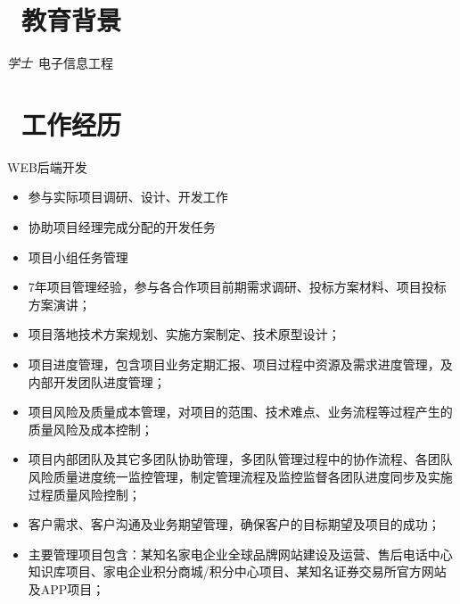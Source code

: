 \documentclass{resume}
\begin{document}


 
\section{\faGraduationCap\  教育背景}
\textit{学士}\ 电子信息工程 

\section{\faUsers\ 工作经历}
\role{软件开发工程师}{}
WEB后端开发
\begin{itemize}
\item 参与实际项目调研、设计、开发工作
\item 协助项目经理完成分配的开发任务
\item 项目小组任务管理
\end{itemize}

\begin{itemize}
    \item 7年项目管理经验，参与各合作项目前期需求调研、投标方案材料、项目投标方案演讲；
    \item 项目落地技术方案规划、实施方案制定、技术原型设计；
    \item 项目进度管理，包含项目业务定期汇报、项目过程中资源及需求进度管理，及内部开发团队进度管理；
    \item 项目风险及质量成本管理，对项目的范围、技术难点、业务流程等过程产生的质量风险及成本控制；
    \item 项目内部团队及其它多团队协助管理，多团队管理过程中的协作流程、各团队风险质量进度统一监控管理，制定管理流程及监控监督各团队进度同步及实施过程质量风险控制；
    \item 客户需求、客户沟通及业务期望管理，确保客户的目标期望及项目的成功；
    \item 主要管理项目包含：某知名家电企业全球品牌网站建设及运营、售后电话中心知识库项目、家电企业积分商城/积分中心项目、某知名证券交易所官方网站及APP项目；
\end{itemize}
\end{document}
